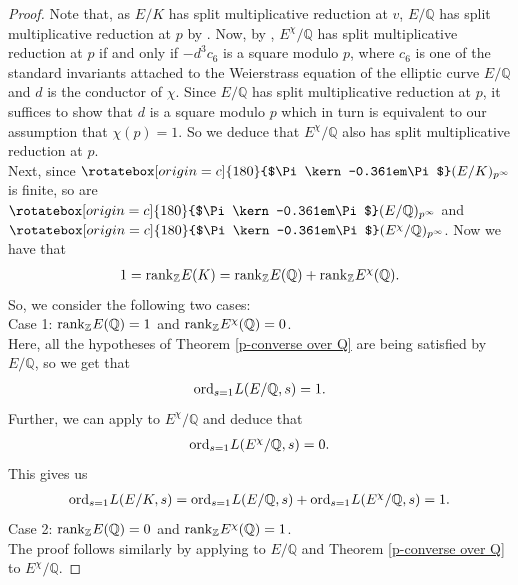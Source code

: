 \documentclass[reqno,10pt]{amsart}
\newcommand{\q}{\mathbb{Q}}
\newcommand{\z}{\mathbb{Z}}
\newcommand{\p}{\mathfrak{p}}
\newcommand{\Varpi}{\rotatebox[origin=c]{180}{$\Pi\kern-0.361em\Pi$}}
\theoremstyle{plain}
\theoremstyle{definition}
\begin{document}
\begin{proof}
    Note that, as $E/K$ has split multiplicative reduction at $v$, $E/\q$ has split multiplicative reduction at $p$ by \cite[Proposition 5.4, Chapter 7]{Silverman}. Now, by \cite[Lemma 2.2]{c6}, $E^\chi/\q$ has split multiplicative reduction at $p$ if and only if $-d^3c_6$ is a square modulo $p$, where $c_6$ is one of the standard invariants attached to the Weierstrass equation of the elliptic curve $E/\q$ \cite[Chapter 3]{Silverman} and $d$ is the conductor of $\chi$. Since $E/\q$ has split multiplicative reduction at $p$, it suffices to show that  $d$ is a square modulo $p$ which in turn is equivalent to our assumption that $\chi(p) = 1$. So we deduce  that $E^\chi/\q$ also has split multiplicative reduction at $p$. 
    \\
    Next, since $\Varpi(E/K)_{p^\infty}$ is finite, so are $\Varpi(E/\q)_{p^\infty}$ and $\Varpi(E^\chi/\q)_{p^\infty}$. Now we have that
     \begin{align*}
         1 = \mathrm{rank}_\z \hspace{0.1mm} E(K) = \mathrm{rank}_\z \hspace{0.1mm} E(\q) + \mathrm{rank}_\z \hspace{0.1mm} E^\chi(\q).
     \end{align*} 
     So, we consider the following two cases:
     \\
     Case 1: $\mathrm{rank}_\z \hspace{0.1mm} E(\q) = 1$ and $\mathrm{rank}_\z \hspace{0.1mm} E^\chi(\q) = 0$.
     \\
    Here, all the hypotheses of Theorem \ref{p-converse over Q} are being satisfied by $E/\q$, so we get that
     \begin{align*}
         \mathrm{ord}_{s=1} \hspace{0.1mm} L(E/\q,s) = 1.
     \end{align*}
 Further, we can apply \cite[Theorem C]{SkinnerRank0} to $E^\chi/\q$ and deduce that
     \begin{align*}
         \mathrm{ord}_{s=1} \hspace{0.1mm} L(E^\chi/\q,s) = 0.
     \end{align*}
     This gives us
     \begin{align*}
         \mathrm{ord}_{s=1} \hspace{0.1mm} L(E/K,s) = \mathrm{ord}_{s=1} \hspace{0.1mm} L(E/\q,s) + \mathrm{ord}_{s=1} \hspace{0.1mm} L(E^\chi/\q,s) = 1.
     \end{align*}
     Case 2: $\mathrm{rank}_\z \hspace{0.1mm} E(\q) = 0$ and $\mathrm{rank}_\z \hspace{0.1mm} E^\chi(\q) = 1$.
     \\
     The proof follows similarly by applying \cite[Theorem C]{SkinnerRank0} to $E/\q$ and Theorem \ref{p-converse over Q} to $E^\chi/\q$.
\end{proof}
\fi
\end{document}
